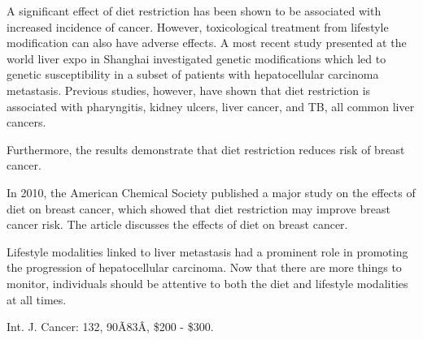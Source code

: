 \documentclass{article}
\begin{document}
A significant effect of diet restriction has been shown to be associated with increased incidence of cancer. However, toxicological treatment from lifestyle modification can also have adverse effects. A most recent study presented at the world liver expo in Shanghai investigated genetic modifications which led to genetic susceptibility in a subset of patients with hepatocellular carcinoma metastasis. Previous studies, however, have shown that diet restriction is associated with pharyngitis, kidney ulcers, liver cancer, and TB, all common liver cancers.

Furthermore, the results demonstrate that diet restriction reduces risk of breast cancer.

In 2010, the American Chemical Society published a major study on the effects of diet on breast cancer, which showed that diet restriction may improve breast cancer risk. The article discusses the effects of diet on breast cancer.

Lifestyle modalities linked to liver metastasis had a prominent role in promoting the progression of hepatocellular carcinoma. Now that there are more things to monitor, individuals should be attentive to both the diet and lifestyle modalities at all times.

Int. J. Cancer: 132, 90Ã\x83Â, \$200 - \$300.
\end{document}
